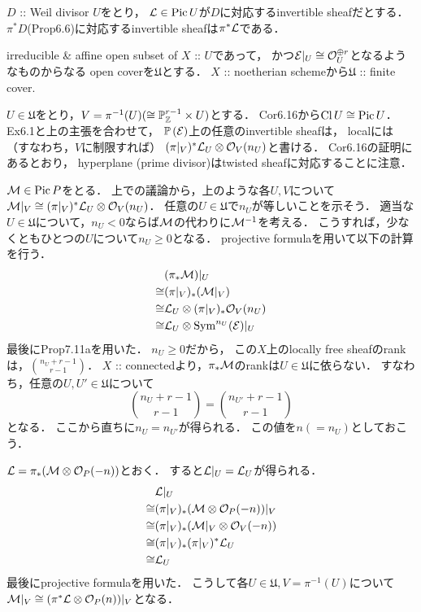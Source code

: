 \documentclass[a4paper]{jsarticle}
\newcommand{\coverU}{\mathfrak{U}}
\newcommand{\Cl}{\operatorname{Cl}}
\newcommand{\Pic}{\operatorname{Pic}}
\newcommand{\Sym}{\operatorname{Sym}}
\newcommand{\pbundle}{\mathbb{P}\,}
\begin{document}
    \begin{Cor}
        $D$ :: Weil divisor $U$をとり，
        $\shL \in \Pic U$が$D$に対応するinvertible sheafだとする．
        $\pi^* D$(Prop6.6)に対応するinvertible sheafは$\pi^* \mathcal{L}$である．
    \end{Cor}

    irreducible \& affine open subset of $X$ :: $U$であって，
    かつ$\mathcal{E}|_U \cong \mathcal{O}_U^{\oplus r}$となるようなものからなる
    open coverを$\coverU$とする．
    $X$ :: noetherian schemeから$\coverU$ :: finite cover.

    $U \in \coverU$をとり，$V=\pi^{-1}(U) (\cong \mathbb{P}^{r-1}_{\mathbb{Z}} \times U)$とする．
    Cor6.16から$\Cl U \iso \Pic U$．
    Ex6.1と上の主張を合わせて，
    $\pbundle(\shE)$上の任意のinvertible sheafは，
    localには（すなわち，$V$に制限すれば）
    $(\pi|_V)^* \mathcal{L}_U \otimes \mathcal{O}_V(n_U)$と書ける．
    Cor6.16の証明にあるとおり，
    hyperplane (prime divisor)はtwisted sheafに対応することに注意．

    $\shM \in \Pic P$をとる．
    上での議論から，上のような各$U, V$について
    $\mathcal{M}|_V \cong (\pi|_V)^* \mathcal{L}_U \otimes \mathcal{O}_V(n_U)$．
    任意の$U \in \coverU$で$n_U$が等しいことを示そう．
    適当な$U \in \coverU$について，$n_{U}<0$ならば$\mathcal{M}$の代わりに$\mathcal{M}^{-1}$を考える．
    こうすれば，少なくともひとつの$U$について$n_{U} \geq 0$となる．
    projective formulaを用いて以下の計算を行う．
    \begin{align*}
        {}&     (\pi_*\shM)|_{U} \\
        \iso&   (\pi|_V)_* (\shM|_V) \\
        \iso&   \shL_U \otimes (\pi|_V)_* \shO_V(n_U) \\
        \iso&   \shL_U \otimes \Sym^{n_{U}}(\shE)|_U
    \end{align*}
    最後にProp7.11aを用いた．
    $n_U \geq 0$だから，
    この$X$上のlocally free sheafのrankは，$\binom{n_U+r-1}{r-1}$．
    $X$ :: connectedより，$\pi_* \mathcal{M}$のrankは$U \in \coverU$に依らない．
    すなわち，任意の$U, U' \in \coverU$について
    \[ \binom{n_U+r-1}{r-1}=\binom{n_{U'}+r-1}{r-1} \]
    となる．
    ここから直ちに$n_U=n_{U'}$が得られる．
    この値を$n (=n_U)$としておこう．


    $\mathcal{L}=\pi_*(\mathcal{M} \otimes \mathcal{O}_P(-n))$とおく．
    すると$\mathcal{L}|_U=\mathcal{L}_U$が得られる．
    \begin{align*}
        {}&     \mathcal{L}|_U \\
        \cong&   (\pi|_V)_* (\mathcal{M} \otimes \mathcal{O}_P(-n))|_V \\
        \cong&   (\pi|_V)_* (\mathcal{M}|_V \otimes \mathcal{O}_V(-n)) \\
        \cong&   (\pi|_V)_* (\pi|_V)^*\mathcal{L}_U \\
        \cong&   \mathcal{L}_U
    \end{align*}
    最後にprojective formulaを用いた．
    こうして各$U \in \coverU, V=\pi^{-1}(U)$について
    $\mathcal{M}|_V \cong (\pi^* \mathcal{L} \otimes \mathcal{O}_P(n))|_V$となる．
\end{document}
